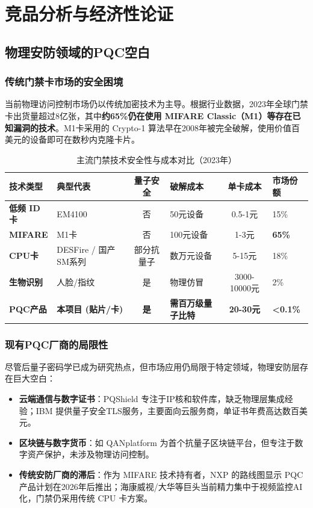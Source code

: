 \chapter{竞品分析与经济性论证}

\section{物理安防领域的PQC空白}

\subsection{传统门禁卡市场的安全困境}

当前物理访问控制市场仍以传统加密技术为主导。根据行业数据，2023年全球门禁卡出货量超过8亿张，其中\textbf{约65\%仍在使用 MIFARE Classic（M1）等存在已知漏洞的技术}。M1卡采用的 Crypto-1 算法早在2008年被完全破解，使用价值百美元的设备即可在数秒内克隆卡片。

\begin{table}[htbp]
	\centering
	\caption{主流门禁技术安全性与成本对比（2023年）}
	\label{tab:market_tech_comparison}
	\renewcommand{\arraystretch}{1.3}
	\begin{tabular}{p{2.5cm}p{3cm}cp{3cm}cp{1.5cm}}
		\toprule
		\textbf{技术类型} & \textbf{典型代表} & \textbf{量子安全} & \textbf{破解成本} & \textbf{单卡成本} & \textbf{市场份额} \\
		\midrule
		\textbf{低频 ID卡} & EM4100 & 否 & 50元设备 & 0.5-1元 & 15\% \\
		\textbf{MIFARE} & M1卡 & 否 & 100元设备 & 1-3元 & \textbf{65\%} \\
		\textbf{CPU卡} & DESFire / 国产SM系列 & 部分抗量子 & 数万元设备 & 5-15元 & 18\% \\
		\textbf{生物识别} & 人脸/指纹 & 是 & 物理仿冒 & 3000-10000元 & 2\% \\
		\midrule
		\textbf{PQC产品} & \textbf{本项目 (贴片/卡)} & \textbf{是} & \textbf{需百万级量子比特} & \textbf{20-30元} & \textbf{<0.1\%} \\
		\bottomrule
	\end{tabular}
\end{table}

\subsection{现有PQC厂商的局限性}

尽管后量子密码学已成为研究热点，但市场应用仍局限于特定领域，物理安防层存在巨大空白：
\begin{itemize}
	\item \textbf{云端通信与数字证书}：PQShield 专注于IP核和软件库，缺乏物理层集成经验；IBM 提供量子安全TLS服务，主要面向云服务商，单证书年费高达数百美元。
	\item \textbf{区块链与数字货币}：如 QANplatform 为首个抗量子区块链平台，但专注于数字资产保护，未涉及物理访问控制。
	\item \textbf{传统安防厂商的滞后}：作为 MIFARE 技术持有者，NXP 的路线图显示 PQC 产品计划在2026年后推出；海康威视/大华等巨头当前精力集中于视频监控AI化，门禁仍采用传统 CPU 卡方案。
\end{itemize}

